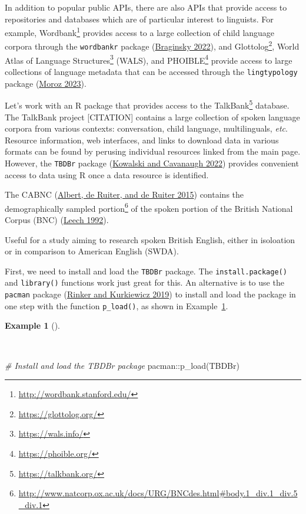 \documentclass[
  letterpaper,
  DIV=11,
  numbers=noendperiod]{scrreport}
\newenvironment{Shaded}{\begin{snugshade}}{\end{snugshade}}
\newcommand{\CommentTok}[1]{\textcolor[rgb]{0.00,0.00,0.00}{\textit{#1}}}
\newcommand{\FunctionTok}[1]{\textcolor[rgb]{0.00,0.00,0.00}{#1}}
\newcommand{\NormalTok}[1]{\textcolor[rgb]{0.00,0.00,0.00}{#1}}
\newcommand{\SpecialCharTok}[1]{\textcolor[rgb]{0.00,0.00,0.00}{#1}}
\theoremstyle{definition}
\newtheorem{example}{Example}[chapter]
\theoremstyle{remark}
\DeclareRobustCommand{\href}[2]{#2\footnote{\url{#1}}}
\begin{document}
In addition to popular public APIs, there are also APIs that provide
access to repositories and databases which are of particular interest to
linguists. For example, \href{http://wordbank.stanford.edu/}{Wordbank}
provides access to a large collection of child language corpora through
the \texttt{wordbankr} package
(\protect\hyperlink{ref-R-wordbankr}{Braginsky 2022}), and
\href{https://glottolog.org/}{Glottolog},
\href{https://wals.info/}{World Atlas of Language Structures} (WALS),
and \href{https://phoible.org/}{PHOIBLE} provide access to large
collections of language metadata that can be accessed through the
\texttt{lingtypology} package
(\protect\hyperlink{ref-R-lingtypology}{Moroz 2023}).

Let's work with an R package that provides access to the
\href{https://talkbank.org/}{TalkBank} database. The TalkBank project
 {[}CITATION{]} contains a large collection of spoken
language corpora from various contexts: conversation, child language,
multilinguals, \emph{etc}. Resource information, web interfaces, and
links to download data in various formats can be found by perusing
individual resources linked from the main page. However, the
\texttt{TBDBr} package (\protect\hyperlink{ref-R-TBDBr}{Kowalski and
Cavanaugh 2022}) provides convenient access to data using R once a data
resource is identified.

The CABNC (\protect\hyperlink{ref-Albert2015}{Albert, de Ruiter, and de
Ruiter 2015}) contains the
\href{http://www.natcorp.ox.ac.uk/docs/URG/BNCdes.html\#body.1_div.1_div.5_div.1}{demographically
sampled portion} of the spoken portion of the British National Corpus
(BNC) (\protect\hyperlink{ref-Leech1992}{Leech 1992}).

Useful for a study aiming to research spoken British English, either in
isoloation or in comparison to American English (SWDA).

First, we need to install and load the \texttt{TBDBr} package. The
\texttt{install.package()} and \texttt{library()} functions work just
great for this. An alternative is to use the \texttt{pacman} package
(\protect\hyperlink{ref-R-pacman}{Rinker and Kurkiewicz 2019}) to
install and load the package in one step with the function
\texttt{p\_load()}, as shown in
Example~\ref{exm-ad-install-load-pacman}.

\begin{example}[]\protect\hypertarget{exm-ad-install-load-pacman}{}\label{exm-ad-install-load-pacman}

~

\begin{Shaded}
\begin{Highlighting}[]
\CommentTok{\# Install and load the TBDBr package}
\NormalTok{pacman}\SpecialCharTok{::}\FunctionTok{p\_load}\NormalTok{(TBDBr)}
\end{Highlighting}
\end{Shaded}

\end{example}
\end{document}

